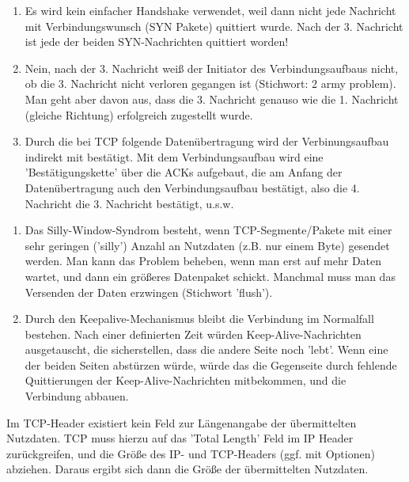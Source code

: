 
\begin{enumerate}
    \item Es wird kein einfacher Handshake verwendet, weil dann nicht jede Nachricht mit Verbindungswunsch (SYN Pakete) quittiert wurde. Nach der 3. Nachricht ist jede der beiden SYN-Nachrichten quittiert worden!
    \item Nein, nach der 3. Nachricht weiß der Initiator des Verbindungsaufbaus nicht, ob die 3. Nachricht nicht verloren gegangen ist (Stichwort: 2 army problem). Man geht aber davon aus, dass die 3. Nachricht genauso wie die 1. Nachricht (gleiche Richtung) erfolgreich zugestellt wurde.
    \item Durch die bei TCP folgende Datenübertragung wird der Verbinungsaufbau indirekt mit bestätigt. Mit dem Verbindungsaufbau wird eine 'Bestätigungskette' über die ACKs aufgebaut, die am Anfang der Datenübertragung auch den Verbindungsaufbau bestätigt, also die 4. Nachricht die 3. Nachricht bestätigt, u.s.w.
\end{enumerate}

\begin{enumerate}
    \item Das Silly-Window-Syndrom besteht, wenn TCP-Segmente/Pakete mit einer sehr geringen ('silly') Anzahl an Nutzdaten (z.B. nur einem Byte) gesendet werden. Man kann das Problem beheben, wenn man erst auf mehr Daten wartet, und dann ein größeres Datenpaket schickt. Manchmal muss man das Versenden der Daten erzwingen (Stichwort 'flush').
    \item Durch den Keepalive-Mechanismus bleibt die Verbindung im Normalfall bestehen.
    Nach einer definierten Zeit würden Keep-Alive-Nachrichten ausgetauscht, die sicherstellen, dass die andere Seite noch 'lebt'. Wenn eine der beiden Seiten abstürzen würde, würde das die Gegenseite durch fehlende Quittierungen der Keep-Alive-Nachrichten mitbekommen, und die Verbindung abbauen.
\end{enumerate}

Im TCP-Header existiert kein Feld zur Längenangabe der übermittelten Nutzdaten.
TCP muss hierzu auf das 'Total Length' Feld im IP Header zurückgreifen, und die Größe des IP- und TCP-Headers (ggf. mit Optionen) abziehen. Daraus ergibt sich dann die Größe der übermittelten Nutzdaten.

